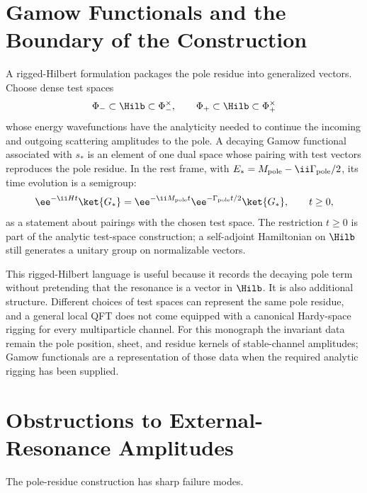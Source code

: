 \section{Gamow Functionals and the Boundary of the Construction}

A rigged-Hilbert formulation packages the pole residue into generalized
vectors.  Choose dense test spaces
\[
  \Phi_-\subset\Hilb\subset\Phi_-^\times,
  \qquad
  \Phi_+\subset\Hilb\subset\Phi_+^\times
\]
whose energy wavefunctions have the analyticity needed to continue the
incoming and outgoing scattering amplitudes to the pole.  A decaying Gamow
functional associated with \(s_\ast\) is an element of one dual space whose
pairing with test vectors reproduces the pole residue.  In the rest frame,
with \(E_\ast=M_{\rm pole}-\ii\Gamma_{\rm pole}/2\), its time evolution is a
semigroup:
\[
  \ee^{-\ii Ht}\ket{G_\ast}
  =
  \ee^{-\ii M_{\rm pole}t}\ee^{-\Gamma_{\rm pole}t/2}\ket{G_\ast},
  \qquad t\ge0,
\]
as a statement about pairings with the chosen test space.  The restriction
\(t\ge0\) is part of the analytic test-space construction; a self-adjoint
Hamiltonian on \(\Hilb\) still generates a unitary group on normalizable
vectors.

This rigged-Hilbert language is useful because it records the decaying pole
term without pretending that the resonance is a vector in \(\Hilb\).  It is
also additional structure.  Different choices of test spaces can represent
the same pole residue, and a general local QFT does not come equipped with a
canonical Hardy-space rigging for every multiparticle channel.  For this
monograph the invariant data remain the pole position, sheet, and residue
kernels of stable-channel amplitudes; Gamow functionals are a representation
of those data when the required analytic rigging has been supplied.

\section{Obstructions to External-Resonance Amplitudes}

The pole-residue construction has sharp failure modes.

